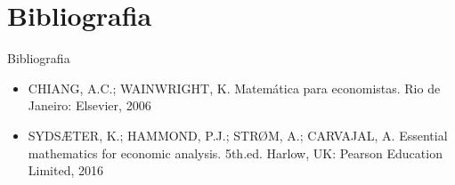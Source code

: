 \documentclass[10pt]{beamer}
\begin{document}
\section{Bibliografia}
\begin{frame}{ Bibliografia}
    \begin{itemize}                
        \item CHIANG, A.C.; WAINWRIGHT, K. Matemática para economistas. Rio de Janeiro: Elsevier, 2006\medskip
        \item SYDSÆTER, K.; HAMMOND, P.J.; STRØM, A.; CARVAJAL, A. Essential mathematics for economic analysis. 5th.ed. Harlow, UK: Pearson Education Limited, 2016
    \end{itemize}
\end{frame}
\end{document}
